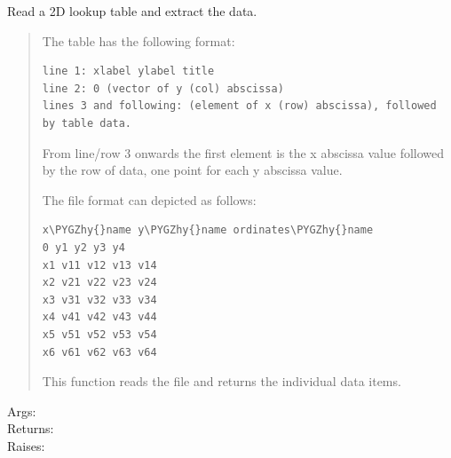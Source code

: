 \documentclass[a4paper,10pt,english]{sphinxmanual}
\def\PYGZhy{\char`\-}
\begin{document}
\begin{fulllineitems}
\label{ryfiles:pyradi.ryfiles.read2DLookupTable}
Read a 2D lookup table and extract the data.
\begin{quote}

The table has the following format:

\begin{Verbatim}[commandchars=\\\{\}]
line 1: xlabel ylabel title
line 2: 0 (vector of y (col) abscissa)
lines 3 and following: (element of x (row) abscissa), followed
by table data.
\end{Verbatim}

From line/row 3 onwards the first element is the x abscissa value
followed by the row of data, one point for each y abscissa value.

The file format can depicted as follows:

\begin{Verbatim}[commandchars=\\\{\}]
x\PYGZhy{}name y\PYGZhy{}name ordinates\PYGZhy{}name
0 y1 y2 y3 y4
x1 v11 v12 v13 v14
x2 v21 v22 v23 v24
x3 v31 v32 v33 v34
x4 v41 v42 v43 v44
x5 v51 v52 v53 v54
x6 v61 v62 v63 v64
\end{Verbatim}

This function reads the file and returns the individual data items.
\end{quote}
\begin{description}
\item[{Args:}] \leavevmode
{}

\item[{Returns:}] \leavevmode
{}

\item[{Raises:}] \leavevmode
{}

\end{description}

\end{fulllineitems}
\end{document}
